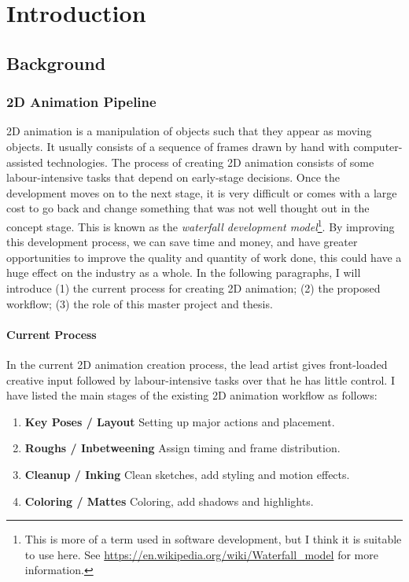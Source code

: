 \chapter{Introduction}
\label{chapterlabel1}
\section{Background}

\subsection{2D Animation Pipeline}
2D animation is a manipulation of objects such that they appear as moving objects. It usually consists of a sequence of frames drawn by hand with computer-assisted technologies. The process of creating 2D animation consists of some labour-intensive tasks that depend on early-stage decisions. Once the development moves on to the next stage, it is very difficult or comes with a large cost to go back and change something that was not well thought out in the concept stage. This is known as the \textit{waterfall development model}\footnote{This is more of a term used in software development, but I think it is suitable to use here. See \url{https://en.wikipedia.org/wiki/Waterfall\_model} for more information.}. By improving this development process, we can save time and money, and have greater opportunities to improve the quality and quantity of work done, this could have a huge effect on the industry as a whole. In the following paragraphs, I will introduce (1) the current process for creating 2D animation;  (2) the proposed workflow; (3) the role of this master project and thesis. 


\subsubsection{Current Process}
In the current 2D animation creation process, the lead artist gives front-loaded creative input followed by labour-intensive tasks over that he has little control. I have listed the main stages of the existing 2D animation workflow as follows:

\begin{enumerate}
    \item \textbf{Key Poses / Layout} Setting up major actions and placement.
    \item \textbf{Roughs / Inbetweening} Assign timing and frame distribution.
    \item \textbf{Cleanup / Inking} Clean sketches, add styling and motion effects.
    \item \textbf{Coloring / Mattes} Coloring, add shadows and highlights.
\end{enumerate}

